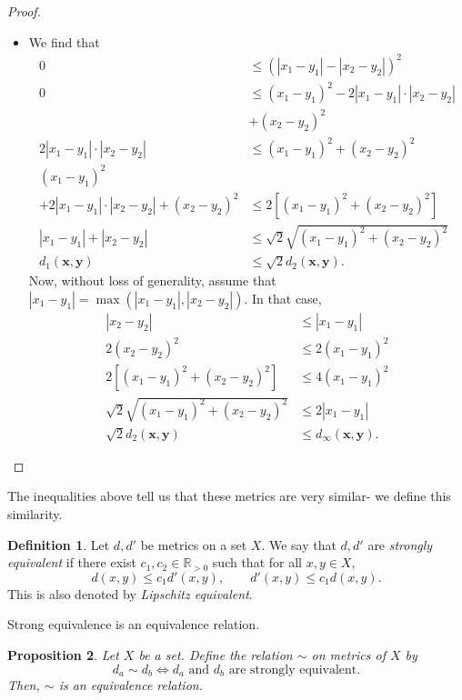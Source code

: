 \documentclass[a4paper, openany]{memoir}
\theoremstyle{definition}
\newtheorem{definition}{Definition}[section]
\theoremstyle{plain}
\newtheorem{proposition}[definition]{Proposition}
\begin{document}
\begin{proof}
\begin{itemize}
    \item We find that
    \begin{align*}
        0 &\leqslant (|x_1 - y_1| - |x_2 - y_2|)^2 \\
        0 &\leqslant (x_1 - y_1)^2 - 2|x_1 - y_1| \cdot |x_2 - y_2| \\
        &+ (x_2 - y_2)^2 \\
        2|x_1 - y_1| \cdot |x_2 - y_2| &\leqslant (x_1 - y_1)^2 + (x_2 - y_2)^2 \\
        (x_1 - y_1)^2 & \\
        + 2|x_1 - y_1| \cdot |x_2 - y_2| + (x_2 - y_2)^2 &\leqslant 2 [(x_1 - y_1)^2 + (x_2 - y_2)^2] \\
        |x_1 - y_1| + |x_2 - y_2| &\leqslant \sqrt{2} \sqrt{(x_1 - y_1)^2 + (x_2 - y_2)^2} \\
        d_1(\bm{x}, \bm{y}) &\leqslant \sqrt{2} d_2(\bm{x}, \bm{y}). 
    \end{align*}
    Now, without loss of generality, assume that $|x_1 - y_1| = \max(|x_1 - y_1|, |x_2 - y_2|)$. In that case, 
    \begin{align*}
        |x_2 - y_2| &\leqslant |x_1 - y_1| \\
        2(x_2 - y_2)^2 &\leqslant 2(x_1 - y_1)^2 \\
        2[(x_1 - y_1)^2 + (x_2 - y_2)^2] &\leqslant 4(x_1 - y_1)^2 \\
        \sqrt{2} \sqrt{(x_1 - y_1)^2 + (x_2 - y_2)^2} &\leqslant 2|x_1 - y_1| \\
        \sqrt{2} d_2(\bm{x}, \bm{y}) &\leqslant d_\infty(\bm{x}, \bm{y}).
    \end{align*}
\end{itemize}
\end{proof}
\noindent The inequalities above tell us that these metrics are very similar- we define this similarity.
\begin{definition}
Let $d, d'$ be metrics on a set $X$. We say that $d, d'$ are \emph{strongly equivalent} if there exist $c_1, c_2 \in \mathbb{R}_{> 0}$ such that for all $x, y \in X$,
\[d(x, y) \leqslant c_1 d'(x, y) , \qquad d'(x, y) \leqslant c_1 d(x, y).\]
This is also denoted by \emph{Lipschitz equivalent}.
\end{definition}
\noindent Strong equivalence is an equivalence relation. 
\begin{proposition}
Let $X$ be a set. Define the relation $\sim$ on metrics of $X$ by
\[d_a \sim d_b \iff d_a \text{ and } d_b \text{ are strongly equivalent}.\]
Then, $\sim$ is an equivalence relation.
\end{proposition}
\end{document}
